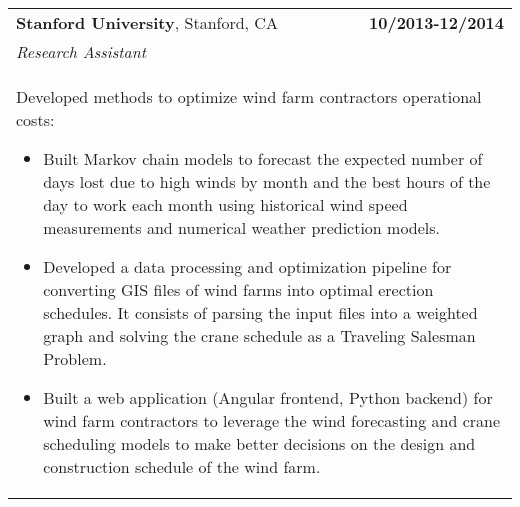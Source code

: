 \documentclass[a4paper,10pt]{article}
\begin{document}
\begin{tabularx}{\textwidth}{Xr}
{\bf{Stanford University}}, Stanford, CA & \bf{10/2013-12/2014}\\
\emph{Research Assistant} &\\
\multicolumn{2}{p{0.98\textwidth}}{
Developed methods to optimize wind farm contractors operational costs:
\begin{itemize} 
	\item Built Markov chain models to forecast the expected number of days lost due to high winds by month and the best hours of the day to work each month using historical wind speed measurements and numerical weather prediction models.
	\item Developed a data processing and optimization pipeline for converting GIS files of wind farms into optimal erection schedules. It consists of parsing the input files into a weighted graph and solving the crane schedule as a Traveling Salesman Problem. 
	\item Built a web application (Angular frontend, Python backend) for wind farm contractors to leverage the wind forecasting and crane scheduling models to make better decisions on the design and construction schedule of the wind farm.
\end{itemize}
}\\





\end{tabularx}
\end{document}
